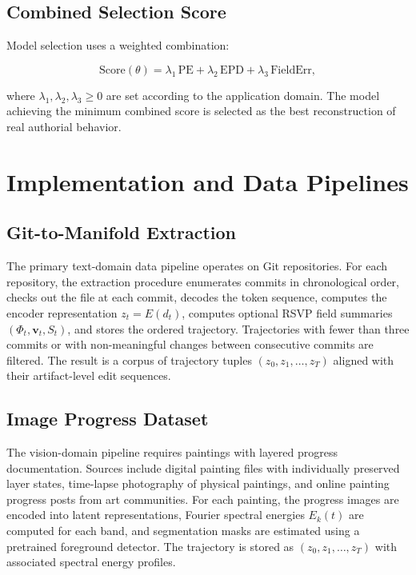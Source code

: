 \documentclass[12pt,a4paper]{article}
\theoremstyle{draftthm}
\newcommand{\enc}{E}
\begin{document}
\subsection{Combined Selection Score}

Model selection uses a weighted combination:

\begin{equation}
  \mathrm{Score}(\theta)
  =
  \lambda_1\, \mathrm{PE}
  +
  \lambda_2\, \mathrm{EPD}
  +
  \lambda_3\, \mathrm{FieldErr},
  \label{eq:combined-score}
\end{equation}

where $\lambda_1, \lambda_2, \lambda_3 \geq 0$ are set according to the application domain. The model achieving the minimum combined score is selected as the best reconstruction of real authorial behavior.

\section{Implementation and Data Pipelines}

\subsection{Git-to-Manifold Extraction}

The primary text-domain data pipeline operates on Git repositories. For each repository, the extraction procedure enumerates commits in chronological order, checks out the file at each commit, decodes the token sequence, computes the encoder representation $z_t = \enc(d_t)$, computes optional RSVP field summaries $(\Phi_t, \mathbf{v}_t, S_t)$, and stores the ordered trajectory. Trajectories with fewer than three commits or with non-meaningful changes between consecutive commits are filtered. The result is a corpus of trajectory tuples $(z_0, z_1, \dots, z_T)$ aligned with their artifact-level edit sequences.

\subsection{Image Progress Dataset}

The vision-domain pipeline requires paintings with layered progress documentation. Sources include digital painting files with individually preserved layer states, time-lapse photography of physical paintings, and online painting progress posts from art communities. For each painting, the progress images are encoded into latent representations, Fourier spectral energies $E_k(t)$ are computed for each band, and segmentation masks are estimated using a pretrained foreground detector. The trajectory is stored as $(z_0, z_1, \dots, z_T)$ with associated spectral energy profiles.
\end{document}
